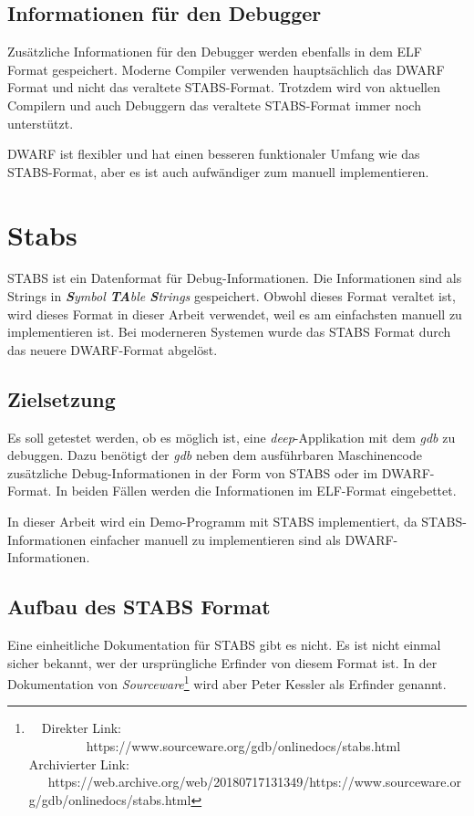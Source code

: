 \subsection{Informationen für den Debugger}
Zusätzliche Informationen für den Debugger werden ebenfalls in dem ELF Format gespeichert.
Moderne Compiler verwenden hauptsächlich das DWARF Format und nicht das veraltete STABS-Format.
Trotzdem wird von aktuellen Compilern und auch Debuggern das veraltete STABS-Format immer noch unterstützt.

DWARF ist flexibler und hat einen besseren funktionaler Umfang wie das STABS-Format, aber es ist auch aufwändiger zum manuell implementieren.





\section{Stabs}
\label{label:stabs}
STABS ist ein Datenformat für Debug-Informationen.
Die Informationen sind als Strings in \textit{\textbf{S}ymbol \textbf{TA}ble \textbf{S}trings} gespeichert.
Obwohl dieses Format veraltet ist, wird dieses Format in dieser Arbeit verwendet, weil es am einfachsten manuell zu implementieren ist.
Bei moderneren Systemen wurde das STABS Format durch das neuere DWARF-Format abgelöst.

\subsection{Zielsetzung}
Es soll getestet werden, ob es möglich ist, eine \textit{deep}-Applikation mit dem \textit{gdb} zu debuggen.
Dazu benötigt der \textit{gdb} neben dem ausführbaren Maschinencode zusätzliche Debug-Informationen in der Form von STABS oder im DWARF-Format.
In beiden Fällen werden die Informationen im ELF-Format eingebettet.

In dieser Arbeit wird ein Demo-Programm mit STABS implementiert, da STABS-Informationen einfacher manuell zu implementieren sind als DWARF-Informationen.


\subsection{Aufbau des STABS Format}
Eine einheitliche Dokumentation für STABS gibt es nicht.
Es ist nicht einmal sicher bekannt, wer der ursprüngliche Erfinder von diesem Format ist.
In der Dokumentation von \textit{Sourceware}\footnote{\ \ Direkter Link: \ \ \ \ \ \ \ \ \ https://www.sourceware.org/gdb/onlinedocs/stabs.html\\ Archivierter Link: \ \ \ https://web.archive.org/web/20180717131349/https://www.sourceware.org/gdb/onlinedocs/stabs.html} wird aber Peter Kessler als Erfinder genannt.

